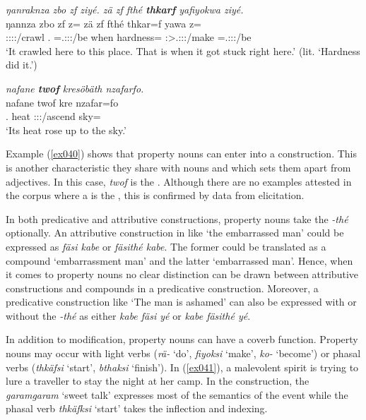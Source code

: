 \begin{exe}
	\ex \emph{ŋanraknza zbo zf ziyé. zä zf fthé \textbf{thkarf} yafiyokwa ziyé.}\\
	\gll ŋannza zbo zf z= zä zf fthé thkar=f yawa z=\\
	\Stsg:\Sbj:\Pst:\Ipfv:\Venit/crawl \Prox.{\All} {\Imm} \Prox=\Tsg.\Masc:\Sbj:\Nonpast:\Ipfv/be {\Prox} {\Imm} when hardness={\Erg} \Stsg:\Sbj>\Tsg.\Masc:\Obj:\Pst:\Ipfv/make \Prox=\Tsg.\Masc:\Sbj:\Nonpast:\Ipfv/be\\
	\trans `It crawled here to this place. That is when it got stuck right here.' (lit. `Hardness did it.') 
	\label{ex035}
\end{exe}
\begin{exe}
	\ex \emph{nafane \textbf{twof} kresöbäth nzafarfo.}\\
	\gll nafane twof kre nzafar=fo\\
	\Tsg.{\Poss} heat \Stsg:\Sbj:\Irr:\Pfv/ascend sky={\All}\\
	\trans `Its heat rose up to the sky.' 
	\label{ex040}
\end{exe}

Example (\ref{ex040}) shows that property nouns can enter into a  construction. This is another characteristic they share with nouns and which sets them apart from adjectives. In this case, \emph{twof} is the . Although there are no examples attested in the corpus where a  is the , this is confirmed by data from elicitation.

In both predicative and attributive constructions, property nouns take the  \emph{-thé} optionally. An attributive construction in  like `the embarrassed man' could be expressed as \emph{fäsi kabe} or \emph{fäsithé kabe}. The former could be translated as a compound `embarrassment man' and the latter `embarrassed man'. Hence, when it comes to property nouns no clear distinction can be drawn between attributive constructions and  compounds in a predicative construction. Moreover, a predicative construction like  `The man is ashamed' can also be expressed with or without the  \emph{-thé} as either \emph{kabe fäsi yé} or \emph{kabe fäsithé yé}.

In addition to  modification, property nouns can have a coverb function. Property nouns may occur with light verbs (\emph{rä-} `do', \emph{fiyoksi} `make', \emph{ko-} `become') or phasal verbs (\emph{thkäfsi} `start', \emph{bthaksi} `finish'). In (\ref{ex041}), a malevolent spirit is trying to lure a traveller to stay the night at her camp. In the construction, the  \emph{garamgaram} `sweet talk' expresses most of the semantics of the event while the phasal verb \emph{thkäfksi} `start' takes the inflection and indexing.

